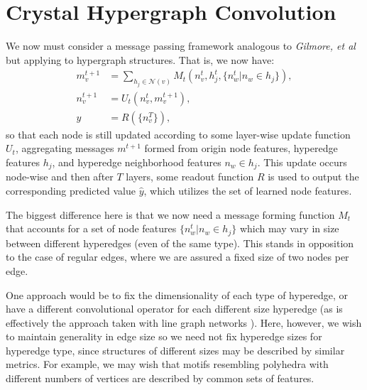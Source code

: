 \documentclass[twoside,twocolumn,9pt]{article}
\begin{document}
\section{Crystal Hypergraph Convolution}

We now must consider a message passing framework analogous to \textit{Gilmore, et al} \cite{mpnn} but applying to hypergraph structures. That is, we now have:
\begin{align*}
	m_v^{t+1}&=\sum_{h_j\in \mathcal{N}(v)} M_t(n_v^{t},h_j^{t},\lbrace n_w^t \vert n_w \in h_j \rbrace),\\
	n_v^{t+1}&=U_t(n_v^t,m_v^{t+1}),\\
	\hat{y}&=R(\lbrace n_v^T\rbrace),
\end{align*}
so that each node is still updated according to some layer-wise update function $U_t$, aggregating messages $m^{t+1}$ formed from origin node features, hyperedge features $h_j$, and hyperedge neighborhood features $n_w \in h_j$. This update occurs node-wise and then after $T$ layers, some readout function $R$ is used to output the corresponding predicted value $\hat{y}$, which utilizes the set of learned node features.



The biggest difference here is that we now need a message forming function $M_t$ that accounts for a set of node features $\lbrace n_w^t \vert n_w \in h_j \rbrace$ which may vary in size between different hyperedges (even of the same type). This stands in opposition to the case of regular edges, where we are assured a fixed size of two nodes per edge. 

One approach would be to fix the dimensionality of each type of hyperedge, or have a different convolutional operator for each different size hyperedge (as is effectively the approach taken with line graph networks \cite{linegraph_general}). Here, however, we wish to maintain generality in edge size so we need not fix hyperedge sizes for hyperedge type, since structures of different sizes may be described by similar metrics. For example, we may wish that motifs resembling polyhedra with different numbers of vertices are described by common sets of features.
\end{document}
